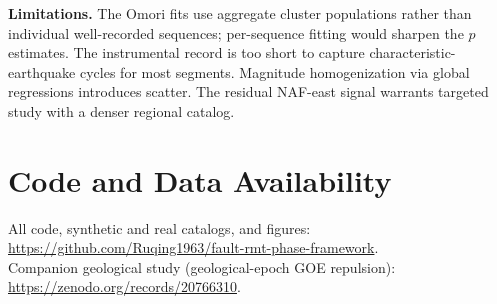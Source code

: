 \documentclass[12pt,a4paper]{article}
\begin{document}
\textbf{Limitations.} The Omori fits use aggregate cluster populations rather than individual well-recorded sequences; per-sequence fitting would sharpen the $p$ estimates. The instrumental record is too short to capture characteristic-earthquake cycles for most segments. Magnitude homogenization via global regressions introduces scatter. The residual NAF-east signal warrants targeted study with a denser regional catalog.

\section*{Code and Data Availability}
All code, synthetic and real catalogs, and figures: \url{https://github.com/Ruqing1963/fault-rmt-phase-framework}.\\
Companion geological study (geological-epoch GOE repulsion): \url{https://zenodo.org/records/20766310}.
\end{document}
